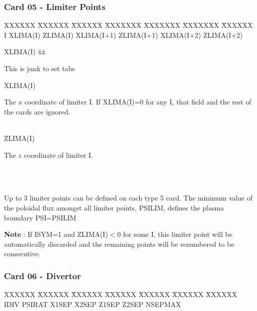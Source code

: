 \newpage \subsubsection{Card 05 - Limiter Points} 
\begin{tabbing} 
XXXXXX \= XXXXXX \= XXXXXX \= XXXXXXX \= XXXXXXX \= XXXXXXX \=
XXXXXX        \\ 
\footnotesize I \>\footnotesize XLIMA(I) \>\footnotesize ZLIMA(I) \>\footnotesize XLIMA(I+1)
\>\footnotesize ZLIMA(I+1) \>\footnotesize XLIMA(I+2) \>\footnotesize ZLIMA(I+2) 
\end{tabbing}
\begin{tabbing} 
XLIMA(I) \= xx\= \parbox[t]{\width}{This is junk to set tabs} \kill 
XLIMA(I) \> \> \parbox[t]{\width}{The $x$ coordinate of limiter I.  If XLIMA(I)=0 for any I,
that
field and the rest of the cards are ignored.}\\ 
ZLIMA(I) \> \> \parbox[t]{\width}{The $z$ coordinate of limiter I.}\\ 
 \\ 
\> \> \parbox[t]{\width}{Up to 3 limiter points can be defined on each type 5 card.  The
minimum
value 
 of the poloidal flux amongst all limiter points, PSILIM, defines the plasma 
 boundary PSI=PSILIM} 
\end{tabbing} 
{\bf Note} : If ISYM=1 and ZLIMA(I)$<$0 for some I, this limiter point will be automatically
discarded and the remaining points will be renumbered to be consecutive.
\newpage \subsubsection{Card 06 - Divertor} 
\begin{tabbing} 
XXXXXX \= XXXXXX \= XXXXXX \= XXXXXX \= XXXXXX \= XXXXXX \=
XXXXXX        \\ 
\footnotesize IDIV \>\footnotesize PSIRAT \>\footnotesize X1SEP \>\footnotesize X2SEP
\>\footnotesize Z1SEP \>\footnotesize Z2SEP \>\footnotesize NSEPMAX 
\end{tabbing}

